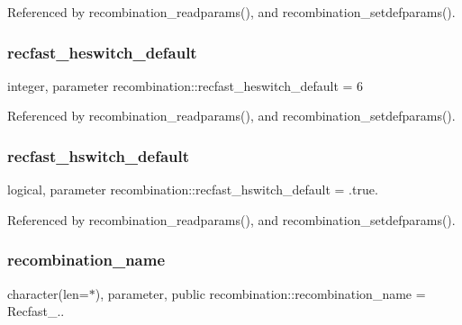 Referenced by recombination\+\_\+readparams(), and recombination\+\_\+setdefparams().

\mbox{\label{namespacerecombination_a517d5a67e1e61e62f788768cb427edd2}} 
\subsubsection{\texorpdfstring{recfast\+\_\+heswitch\+\_\+default}{recfast\_heswitch\_default}}
{\footnotesize\ttfamily integer, parameter recombination\+::recfast\+\_\+heswitch\+\_\+default = 6\hspace{0.3cm}{\ttfamily [private]}}



Referenced by recombination\+\_\+readparams(), and recombination\+\_\+setdefparams().

\mbox{\label{namespacerecombination_ab3f90d31e547798b3aa3fc1403d556fb}} 
\subsubsection{\texorpdfstring{recfast\+\_\+hswitch\+\_\+default}{recfast\_hswitch\_default}}
{\footnotesize\ttfamily logical, parameter recombination\+::recfast\+\_\+hswitch\+\_\+default = .true.\hspace{0.3cm}{\ttfamily [private]}}



Referenced by recombination\+\_\+readparams(), and recombination\+\_\+setdefparams().

\mbox{\label{namespacerecombination_aaaa9430d72f4f49786d010958342bc72}} 
\subsubsection{\texorpdfstring{recombination\+\_\+name}{recombination\_name}}
{\footnotesize\ttfamily character(len=$\ast$), parameter, public recombination\+::recombination\+\_\+name = \textquotesingle{}Recfast\+\_..\textquotesingle{}}

